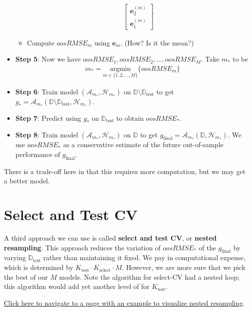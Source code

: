 \documentclass[12pt, a4paper]{article}
\theoremstyle{definition}
\newcommand{\test}{\text{test}}
\newcommand{\select}{\text{select}}
\newcommand{\Dtest}{\mathbb{D}_{\test}}
\begin{document}
\begin{itemize}
\begin{itemize}
\begin{align*}
\begin{bmatrix}
						\bm{e}_{2}^{(m)}\\
						\bm{e}_{1}^{(m)}
					\end{bmatrix}
			\end{align*}
			\item Compute $oosRMSE_m$ using $\bm{e}_m$. (How? Is it the mean?)
		\end{itemize}
		\item \textbf{Step 5}: Now we have $oosRMSE_1,oosRMSE_2,\ldots,oosRMSE_M$. Take $m_*$ to be
		\begin{align*}
			m_* = \underset{m\in\{1,2,\ldots,M\}}{\text{argmin}}
			\{
			oosRMSE_m
			\}
		\end{align*}
		\item \textbf{Step 6}: Train model $(\mathcal{A}_{m_*}, \mathcal{H}_{m_*})$
		on $\mathbb{D}\setminus \Dtest$ to get
		$g_* = \mathcal{A}_{m_*}(\mathbb{D}\setminus \Dtest, \mathcal{H}_{m_*})$.
		\item \textbf{Step 7}: Predict using $g_{*}$ on $\Dtest$ to obtain
		$oosRMSE_*$.
		\item \textbf{Step 8}: Train model $(\mathcal{A}_{m_*}, \mathcal{H}_{m_*})$
		on $\mathbb{D}$ to get $g_{\text{final}} = \mathcal{A}_{m_*} (\mathbb{D}, \mathcal{H}_{m_*})$. We use $oosRMSE_{*}$ as a conservative estimate of the
		future out-of-sample performance of $g_{\text{final}}$.
	\end{itemize}
	There is a trade-off here in that this requires more computation, but we may get
	a better model.
	\section*{Select and Test CV}
	A third approach we can use is called \textbf{select and test CV}, or
	\textbf{nested resampling}. This approach reduces the variation of $oosRMSE_*$
	of the $g_{\text{final}}$ by varying $\Dtest$ rather than maintaining it fixed.
	We pay in computational expense, which is determined by $K_\test\cdot K_\select\cdot M$.
	However, we are more sure that we pick the best of our $M$ models.
	Note the algorithm for select-CV had a nested loop; this algorithm would
	add yet another level of for $K_\test$.
	
	\href{
		https://mlr.mlr-org.com/articles/tutorial/nested_resampling.html}{Click here to navigate to a page with an example to visualize nested resampling}.
\end{document}

